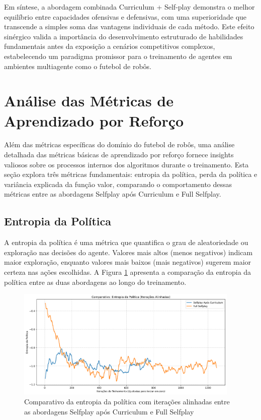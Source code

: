 Em síntese, a abordagem combinada Curriculum + Self-play demonstra o melhor equilíbrio entre capacidades ofensivas e defensivas, com uma superioridade que transcende a simples soma das vantagens individuais de cada método. Este efeito sinérgico valida a importância do desenvolvimento estruturado de habilidades fundamentais antes da exposição a cenários competitivos complexos, estabelecendo um paradigma promissor para o treinamento de agentes em ambientes multiagente como o futebol de robôs.

\section{Análise das Métricas de Aprendizado por Reforço}
\label{sec:analise_metricas_aprendizado}

Além das métricas específicas do domínio do futebol de robôs, uma análise detalhada das métricas básicas de aprendizado por reforço fornece insights valiosos sobre os processos internos dos algoritmos durante o treinamento. Esta seção explora três métricas fundamentais: entropia da política, perda da política e variância explicada da função valor, comparando o comportamento dessas métricas entre as abordagens Selfplay após Curriculum e Full Selfplay.

\subsection{Entropia da Política}

A entropia da política é uma métrica que quantifica o grau de aleatoriedade ou exploração nas decisões do agente. Valores mais altos (menos negativos) indicam maior exploração, enquanto valores mais baixos (mais negativos) sugerem maior certeza nas ações escolhidas. A Figura \ref{fig:policy_entropy} apresenta a comparação da entropia da política entre as duas abordagens ao longo do treinamento.

\begin{figure}[H]
    \centering
    \includegraphics[width=0.95\textwidth]{fig/graficos_trabalho/graficos_experimentos/geral/comparativo_entropia_politica_alinhado.png}
    \caption{Comparativo da entropia da política com iterações alinhadas entre as abordagens Selfplay após Curriculum e Full Selfplay}
    \label{fig:policy_entropy}
\end{figure}

